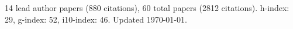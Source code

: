 14 lead author papers (880 citations),
60 total papers (2812 citations).\newline
h-index: 29, g-index: 52, i10-index: 46. Updated \today.